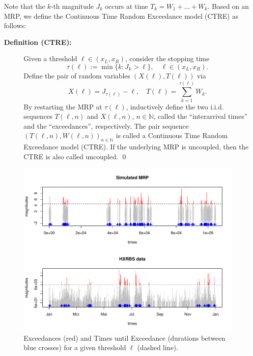 \documentclass[smallextended]{svjour3}       %
\begin{document}
Note that the \(k\)-th magnitude \(J_k\) occurs at time
\(T_k = W_1 + \ldots + W_k\). Based on an MRP, we define the Continuous
Time Random Exceedance model (CTRE) as follows:

\begin{description}
\item[\textbf{Definition (CTRE):}]
Given a threshold \(\ell \in (x_L, x_R)\), consider the stopping time
\[\tau(\ell) := \min\{k: J_k > \ell\},\quad \ell \in (x_L, x_R).\]
Define the pair of random variables \((X(\ell), T(\ell))\) via
\[X(\ell) = J_{\tau(\ell)} - \ell, \quad 
T(\ell) = \sum_{k=1}^{\tau(\ell)} W_k.\] By restarting the MRP at
\(\tau(\ell)\), inductively define the two i.i.d. sequences
\(T(\ell,n)\) and \(X(\ell, n)\), \(n \in \mathbb N\), called the
``interarrival times'' and the ``exceedances'', respectively. The pair
sequence \((T(\ell, n), W(\ell, n))_{n \in \mathbb N}\) is called a
Continuous Time Random Exceedance model (CTRE). If the underlying MRP is
uncoupled, then the CTRE is also called uncoupled. \qed
\end{description}

\begin{figure}
\includegraphics[width=\textwidth]{article_springer_files/figure-latex/thresholdedBursty-1} \caption{\label{fig:thresholdedBursty}Exceedances (red) and Times until Exceedance (durations between blue crosses) for a given threshold $\ell$ (dashed line).}\label{fig:thresholdedBursty}
\end{figure}
\end{document}
